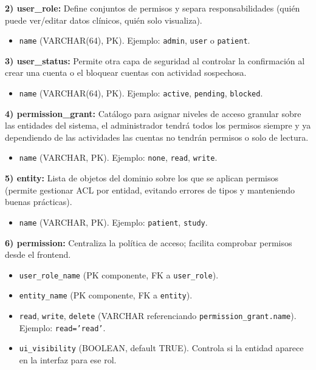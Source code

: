 \documentclass[12pt, a4paper]{article}
\begin{document}
\textbf{2) user\_role:} Define conjuntos de permisos y separa responsabilidades (quién puede ver/editar datos clínicos, quién solo visualiza).

\begin{itemize}
	\item \texttt{name} (VARCHAR(64), PK). Ejemplo: \texttt{admin}, \texttt{user} o \texttt{patient}.
\end{itemize}


\textbf{3) user\_status:} Permite otra capa de seguridad al controlar la confirmación al crear una cuenta o el bloquear cuentas con actividad sospechosa.

\begin{itemize}
	\item \texttt{name} (VARCHAR(64), PK). Ejemplo: \texttt{active}, \texttt{pending}, \texttt{blocked}.
\end{itemize}


\textbf{4) permission\_grant:} Catálogo para asignar niveles de acceso granular sobre las entidades del sistema, el administrador tendrá todos los permisos siempre y ya dependiendo de las actividades las cuentas no tendrán permisos o solo de lectura.


\begin{itemize}
	\item \texttt{name} (VARCHAR, PK). Ejemplo: \texttt{none}, \texttt{read}, \texttt{write}.
\end{itemize}

\textbf{5) entity:} Lista de objetos del dominio sobre los que se aplican permisos (permite gestionar ACL por entidad, evitando errores de tipos y manteniendo buenas prácticas).

\begin{itemize}
	\item \texttt{name} (VARCHAR, PK). Ejemplo: \texttt{patient}, \texttt{study}.
\end{itemize}



\textbf{6) permission:} Centraliza la política de acceso; facilita comprobar permisos desde el frontend.
\begin{itemize}
	\item \texttt{user\_role\_name} (PK componente, FK a \texttt{user\_role}).
	\item \texttt{entity\_name} (PK componente, FK a \texttt{entity}).
	\item \texttt{read}, \texttt{write}, \texttt{delete} (VARCHAR referenciando \texttt{permission\_grant.name}). Ejemplo: \texttt{read='read'}.
	\item \texttt{ui\_visibility} (BOOLEAN, default TRUE). Controla si la entidad aparece en la interfaz para ese rol.
\end{itemize}
\end{document}
